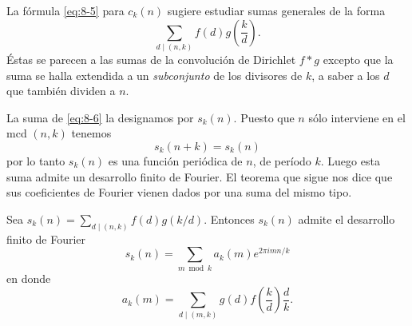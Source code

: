 \documentclass[12pt,a4paper]{book}
\begin{document}
    La fórmula \eqref{eq:8-5} para $c_{k}(n)$ sugiere estudiar sumas generales de la forma
    \begin{equation}\label{eq:8-6}
        \sum_{d\mid(n,k)}f(d)g\left(\frac{k}{d}\right).
    \end{equation}
    Éstas se parecen a las sumas de la convolución de Dirichlet $f*g$ excepto que la suma se
    halla extendida a un \textit{subconjunto} de los divisores de $k$, a saber a los $d$ que
    también dividen a $n$.

    La suma de \eqref{eq:8-6} la designamos por $s_{k}(n)$. Puesto que $n$ sólo interviene en
    el mcd $(n,k)$ tenemos
    \begin{equation*}
        s_{k}(n+k)=s_{k}(n)
    \end{equation*}
    por lo tanto $s_{k}(n)$ es una función periódica de $n$, de período $k$. Luego esta suma
    admite un desarrollo finito de Fourier. El teorema que sigue nos dice que sus
    coeficientes de Fourier vienen dados por una suma del mismo tipo.

    \begin{teorema}
        Sea $s_{k}(n)=\sum_{d\mid(n,k)}f(d)g(k/d)$. Entonces $s_{k}(n)$ admite el desarrollo
        finito de Fourier
        \begin{equation}\label{eq:8-7}
            s_{k}(n)=\sum_{m\bmod k}a_{k}(m)e^{2\pi imn/k}
        \end{equation}
        en donde
        \begin{equation}\label{eq:8-8}
            a_{k}(m)=\sum_{d\mid(m,k)}g(d)f\left(\frac{k}{d}\right)\frac{d}{k}.
        \end{equation}
    \end{teorema}
\end{document}
